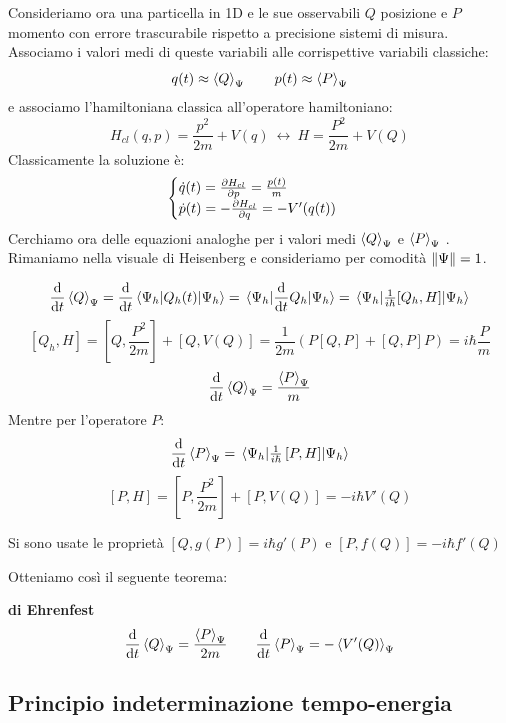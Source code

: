 Consideriamo ora una particella in 1D e le sue osservabili \(Q\) posizione e \(P\) momento con errore trascurabile rispetto a precisione sistemi di misura.\\
Associamo i valori medi di queste variabili alle corrispettive variabili classiche:
\[
    q(t) \approx \expval{Q}_\Psi \qquad p(t) \approx \expval{P}_\Psi    
\]
e associamo l'hamiltoniana classica all'operatore hamiltoniano:
\[
    H_{cl} (q,p)= \frac{p^2}{2m} + V(q)\  \longleftrightarrow \ H = \frac{P^2}{2m} + V(Q)
\]
Classicamente la soluzione è:
\[
    \begin{cases}
        \dot{q}(t) = \pdv{H_{cl}}{p} = \frac{p(t)}{m}\\
        \dot{p}(t) = - \pdv{H_{cl}}{q} = - V' (q(t))
    \end{cases}
\]
Cerchiamo ora delle equazioni analoghe per i valori medi \(\expval{Q}_\Psi\) e \(\expval{P}_\Psi\) . 
Rimaniamo nella visuale di Heisenberg e consideriamo per comodità \(\norm{\Psi}=1\).

\[
\dv{t} \expval{Q}_{\Psi}
= \dv{t}\expval{Q_h(t)}{\Psi_h}
= \expval{\dv{t} Q_h}{\Psi_h}
= \expval{\tfrac{1}{i\hbar}[Q_h, H]}{\Psi_h}
\]
\[
    \left[ Q_h, H \right]  = \left[ Q, \frac{P^2}{2m} \right] + \left[ Q, V(Q) \right] = \frac{1}{2m}\left( P\left[ Q,P \right] + [Q,P]P \right) = i\hbar \frac{P}{m}
\]
\[
    \dv{t} \expval{Q}_{\Psi} = \frac{\expval{P}_\Psi}{m}
\]
Mentre per l'operatore \(P\):
\[
    \dv{t} \expval{P}_\Psi  = \expval{\tfrac{1}{i\hbar}\left[ P, H \right]}{\Psi_h}
\]
\[
    \left[ P,H  \right]= \left[ P, \frac{P^2}{2m} \right] + \left[ P, V(Q) \right]  = -i\hbar V'(Q)
\]
\begin{attention}
    Si sono usate le proprietà \(\left[ Q, g(P) \right]= i \hbar g'(P)\)  e \(\left[ P, f(Q) \right]= -i\hbar f'(Q)\)
\end{attention}

Otteniamo così il seguente teorema:

\begin{theorem} \label{theo: Ehrenfest}
    {\normalfont\textbf{di Ehrenfest}}
    \begin{equation}
        \dv{t}\expval{Q}_{\Psi} = \frac{\expval{P}_\Psi}{2m} \qquad \dv{t}\expval{P}_\Psi = - \expval{V'(Q)}_{\Psi}
    \end{equation}
\end{theorem}


\subsection{Principio indeterminazione tempo-energia}

